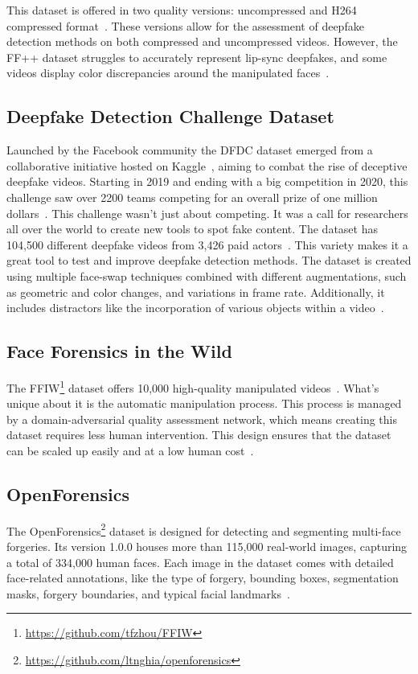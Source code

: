 This dataset is offered in two quality versions: uncompressed and H264~\cite{enwiki:1168205077}
compressed format~\cite{deepfake-dataset}. These versions allow for the assessment of
deepfake detection methods on both compressed and uncompressed videos. However, the \ac{FF++}
dataset struggles to accurately represent lip-sync deepfakes, and some videos display
color discrepancies around the manipulated faces~\cite{deepfake-dataset}.

\subsection{Deepfake Detection Challenge Dataset}
Launched by the Facebook community the \ac{DFDC} dataset emerged from a collaborative initiative
hosted on Kaggle~\cite{kaggle2020}, aiming to combat the rise of deceptive deepfake
videos. Starting in 2019 and ending with a big competition in 2020, this challenge saw
over 2200 teams competing for an overall prize of one million dollars~\cite{masters-thesis}.
This challenge wasn't just about competing. It was a call for researchers all over the world to create new tools to spot fake
content. The dataset has 104,500 different deepfake videos from 3,426 paid
actors~\cite{dolhansky2020deepfake,masters-thesis}. This variety makes it a great tool to test
and improve deepfake detection methods. The dataset is created using multiple face-swap
techniques combined with different augmentations, such as geometric and color changes,
and variations in frame rate. Additionally, it includes distractors like the incorporation
of various objects within a video~\cite{deepfake-dataset}.

\subsection{Face Forensics in the Wild}
The \ac{FFIW}\footnote{\url{https://github.com/tfzhou/FFIW}} dataset offers 10,000 high-quality
manipulated videos~\cite{Zhou_2021_CVPR}. What's unique about it is the automatic manipulation
process. This process is managed by a domain-adversarial quality assessment network, which
means creating this dataset requires less human intervention. This design ensures that the
dataset can be scaled up easily and at a low human cost~\cite{Zhou_2021_CVPR}.

\subsection{OpenForensics}
The OpenForensics\footnote{\url{https://github.com/ltnghia/openforensics}} dataset is
designed for detecting and segmenting multi-face forgeries.
Its version 1.0.0 houses more than 115,000 real-world images, capturing a total of 334,000 human faces.
Each image in the dataset comes with detailed face-related annotations, like the type
of forgery, bounding boxes, segmentation masks, forgery boundaries, and typical facial
landmarks~\cite{ltnghia-ICCV2021}.


